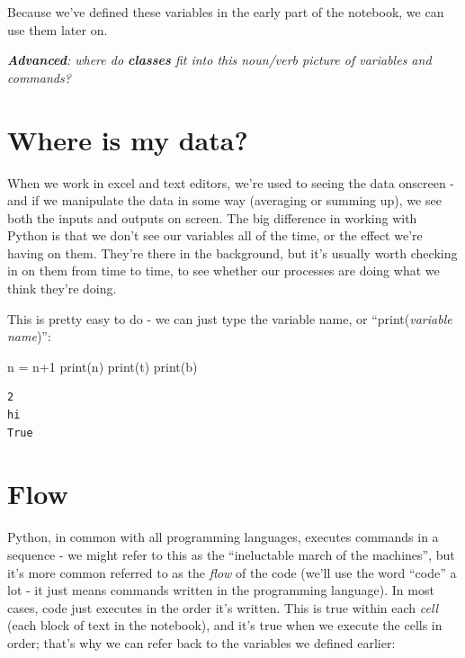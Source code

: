 \documentclass[
  letterpaper,
  DIV=11,
  numbers=noendperiod]{scrreprt}
\newenvironment{Shaded}{\begin{snugshade}}{\end{snugshade}}
\newcommand{\BuiltInTok}[1]{\textcolor[rgb]{0.00,0.23,0.31}{#1}}
\newcommand{\DecValTok}[1]{\textcolor[rgb]{0.68,0.00,0.00}{#1}}
\newcommand{\NormalTok}[1]{\textcolor[rgb]{0.00,0.23,0.31}{#1}}
\newcommand{\OperatorTok}[1]{\textcolor[rgb]{0.37,0.37,0.37}{#1}}
\begin{document}
Because we've defined these variables in the early part of the notebook,
we can use them later on.

\emph{\textbf{Advanced}: where do \textbf{classes} fit into this
noun/verb picture of variables and commands?}

\hypertarget{where-is-my-data}{%
\section{Where is my data?}\label{where-is-my-data}}

When we work in excel and text editors, we're used to seeing the data
onscreen - and if we manipulate the data in some way (averaging or
summing up), we see both the inputs and outputs on screen. The big
difference in working with Python is that we don't see our variables all
of the time, or the effect we're having on them. They're there in the
background, but it's usually worth checking in on them from time to
time, to see whether our processes are doing what we think they're
doing.

This is pretty easy to do - we can just type the variable name, or
``print(\emph{variable name})'':

\begin{Shaded}
\begin{Highlighting}[]
\NormalTok{n }\OperatorTok{=}\NormalTok{ n}\OperatorTok{+}\DecValTok{1}
\BuiltInTok{print}\NormalTok{(n)}
\BuiltInTok{print}\NormalTok{(t)}
\BuiltInTok{print}\NormalTok{(b)}
\end{Highlighting}
\end{Shaded}

\begin{verbatim}
2
hi
True
\end{verbatim}

\hypertarget{flow}{%
\section{Flow}\label{flow}}

Python, in common with all programming languages, executes commands in a
sequence - we might refer to this as the ``ineluctable march of the
machines'', but it's more common referred to as the \emph{flow} of the
code (we'll use the word ``code'' a lot - it just means commands written
in the programming language). In most cases, code just executes in the
order it's written. This is true within each \emph{cell} (each block of
text in the notebook), and it's true when we execute the cells in order;
that's why we can refer back to the variables we defined earlier:
\end{document}
